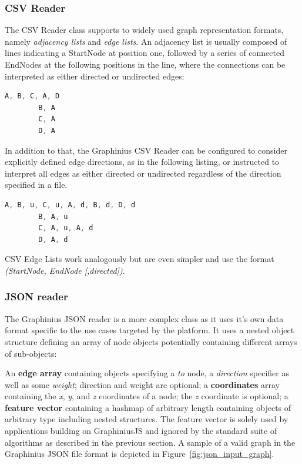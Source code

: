 		
		\subsubsection{CSV Reader}
		\label{sssection: io_csv}
		
		The CSV Reader class supports to widely used graph representation formats, namely \textit{adjacency lists} and \textit{edge lists}. An adjacency list is usually composed of lines indicating a StartNode at position one, followed by a series of connected EndNodes at the following positions in the line, where the connections can be interpreted as either directed or undirected edges:
		
		\begin{lstlisting}[caption={Sample Adjacency list, no edge direction.}, label={lst:adj_list_nodir}, language=JavaScript]
		A, B, C, A, D
		B, A
		C, A
		D, A
		\end{lstlisting}
		
		In addition to that, the Graphinius CSV Reader can be configured to consider explicitly defined edge directions, as in the following listing, or instructed to interpret all edges as either directed or undirected regardless of the direction specified in a file.
		
		\begin{lstlisting}[caption={Sample Adjacency list including edge direction.}, label={lst:adj_list_dir}, language=JavaScript]
		A, B, u, C, u, A, d, B, d, D, d
		B, A, u
		C, A, u, A, d
		D, A, d
		\end{lstlisting}
		
		CSV Edge Lists work analogously but are even simpler and use the format \textit{(StartNode, EndNode [,directed])}.	
		
		
		\subsubsection{JSON reader}
		\label{sssection: io_json}
		
		The Graphinius JSON reader is a more complex class as it uses it's own data format specific to the use cases targeted by the platform. It uses a nested object structure defining an array of node objects potentially containing different arrays of sub-objects:
		
		An \textbf{edge array} containing objects specifying a \textit{to} node, a \textit{direction} specifier as well as some \textit{weight}; direction and weight are optional; a \textbf{coordinates} array containing the \textit{x}, \textit{y}, and \textit{z} coordinates of a node; the \textit{z} coordinate is optional; a \textbf{feature vector} containing a hashmap of arbitrary length containing objects of arbitrary type including nested structures. The feature vector is solely used by applications building on GraphiniusJS and ignored by the standard suite of algorithms as described in the previous section. A sample of a valid graph in the Graphinius JSON file format is depicted in Figure~\ref{fig:json_input_graph}.
		
